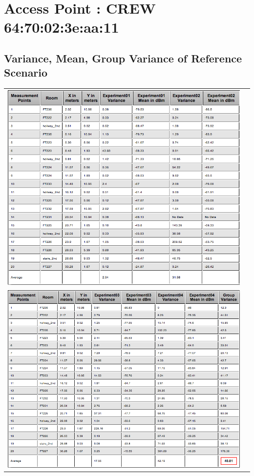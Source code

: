\documentclass[11pt,a4paper,headinclude,footinclude,chapterprefix=on]{scrreprt}
\begin{document}
\section{Access Point : CREW 64:70:02:3e:aa:11} 
\subsection{Variance, Mean, Group Variance of Reference Scenario} 
\begin{longtable}
	{lr} 
	\includegraphics[width=15cm]{../../Source/plot/data/11_ref1.png} \\
	\includegraphics[width=15cm]{../../Source/plot/data/11_ref2.png} \\
\end{longtable}
\end{document}
